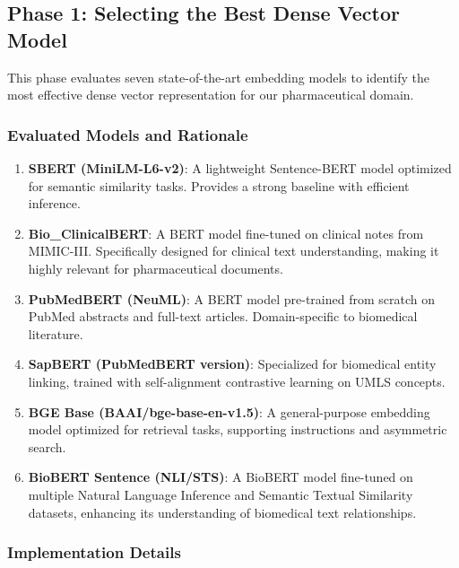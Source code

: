 \subsection{Phase 1: Selecting the Best Dense Vector Model}
\label{subsec:phase1-dense-model-selection}

This phase evaluates seven state-of-the-art embedding models to identify the most effective dense vector representation for our pharmaceutical domain.

\subsubsection{Evaluated Models and Rationale}
\label{subsubsec:evaluated-models}

\begin{enumerate}
    \item \textbf{SBERT (MiniLM-L6-v2)}: A lightweight Sentence-BERT model optimized for semantic similarity tasks. Provides a strong baseline with efficient inference.

    \item \textbf{Bio\_ClinicalBERT}: A BERT model fine-tuned on clinical notes from MIMIC-III. Specifically designed for clinical text understanding, making it highly relevant for pharmaceutical documents.


    \item \textbf{PubMedBERT (NeuML)}: A BERT model pre-trained from scratch on PubMed abstracts and full-text articles. Domain-specific to biomedical literature.

    \item \textbf{SapBERT (PubMedBERT version)}: Specialized for biomedical entity linking, trained with self-alignment contrastive learning on UMLS concepts.

    \item \textbf{BGE Base (BAAI/bge-base-en-v1.5)}: A general-purpose embedding model optimized for retrieval tasks, supporting instructions and asymmetric search.

    \item \textbf{BioBERT Sentence (NLI/STS)}: A BioBERT model fine-tuned on multiple Natural Language Inference and Semantic Textual Similarity datasets, enhancing its understanding of biomedical text relationships.
\end{enumerate}

\subsubsection{Implementation Details}
\label{subsubsec:implementation-details}

